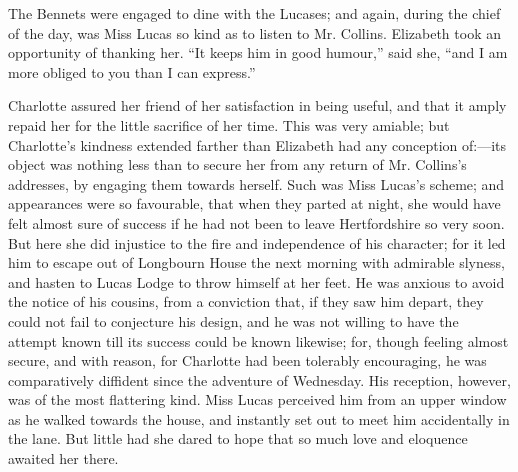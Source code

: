 The Bennets were engaged to dine with the Lucases; and again, during the chief of the day, was Miss Lucas so kind as to listen to Mr. Collins. Elizabeth took an opportunity of thanking her. ``It keeps him in good humour,'' said she, ``and I am more obliged to you than I can express.''

Charlotte assured her friend of her satisfaction in being useful, and that it amply repaid her for the little sacrifice of her time. This was very amiable; but Charlotte's kindness extended farther than Elizabeth had any conception of:---its object was nothing less than to secure her from any return of Mr. Collins's addresses, by engaging them towards herself. Such was Miss Lucas's scheme; and appearances were so favourable, that when they parted at night, she would have felt almost sure of success if he had not been to leave Hertfordshire so very soon. But here she did injustice to the fire and independence of his character; for it led him to escape out of Longbourn House the next morning with admirable slyness, and hasten to Lucas Lodge to throw himself at her feet. He was anxious to avoid the notice of his cousins, from a conviction that, if they saw him depart, they could not fail to conjecture his design, and he was not willing to have the attempt known till its success could be known likewise; for, though feeling almost secure, and with reason, for Charlotte had been tolerably encouraging, he was comparatively diffident since the adventure of Wednesday. His reception, however, was of the most flattering kind. Miss Lucas perceived him from an upper window as he walked towards the house, and instantly set out to meet him accidentally in the lane. But little had she dared to hope that so much love and eloquence awaited her there.

